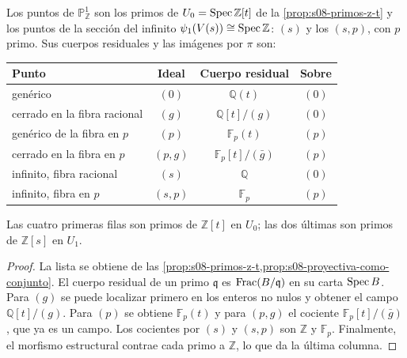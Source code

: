 \begin{samepage}
\begin{prop}
\label{prop:s08-puntos-sobre-z}
\label{ejem:s08-puntos-sobre-z}
Los puntos de $\mathbb P_{\mathbb Z}^1$ son los primos de $U_0=\operatorname{Spec}\mathbb Z[t]$ de la \cref{prop:s08-primos-z-t} y los puntos de la sección del infinito $\psi_1(V(s))\cong\operatorname{Spec}\mathbb Z$: $(s)$ y los $(s,p)$, con $p$ primo. Sus cuerpos residuales y las imágenes por $\pi$ son:
\begin{center}
\normalfont
\small
\renewcommand{\arraystretch}{1.3}
\begin{tabular}{lccc}
\hline
Punto & Ideal & Cuerpo residual & Sobre\\
\hline
genérico & $(0)$ & $\mathbb Q(t)$ & $(0)$\\
cerrado en la fibra racional & $(g)$ & $\mathbb Q[t]/(g)$ & $(0)$\\
genérico de la fibra en $p$ & $(p)$ & $\mathbb F_p(t)$ & $(p)$\\
cerrado en la fibra en $p$ & $(p,g)$ & $\mathbb F_p[t]/(\bar g)$ & $(p)$\\
infinito, fibra racional & $(s)$ & $\mathbb Q$ & $(0)$\\
infinito, fibra en $p$ & $(s,p)$ & $\mathbb F_p$ & $(p)$\\
\hline
\end{tabular}
\end{center}
Las cuatro primeras filas son primos de $\mathbb Z[t]$ en $U_0$; las dos últimas son primos de $\mathbb Z[s]$ en $U_1$.
\end{prop}
\end{samepage}
\begin{proof}
La lista se obtiene de las \cref{prop:s08-primos-z-t,prop:s08-proyectiva-como-conjunto}. El cuerpo residual de un primo $\mathfrak q$ es $\operatorname{Frac}(B/\mathfrak q)$ en su carta $\operatorname{Spec} B$. Para $(g)$ se puede localizar primero en los enteros no nulos y obtener el campo $\mathbb Q[t]/(g)$. Para $(p)$ se obtiene $\mathbb F_p(t)$ y para $(p,g)$ el cociente $\mathbb F_p[t]/(\bar g)$, que ya es un campo. Los cocientes por $(s)$ y $(s,p)$ son $\mathbb Z$ y $\mathbb F_p$. Finalmente, el morfismo estructural contrae cada primo a $\mathbb Z$, lo que da la última columna.
\end{proof}

